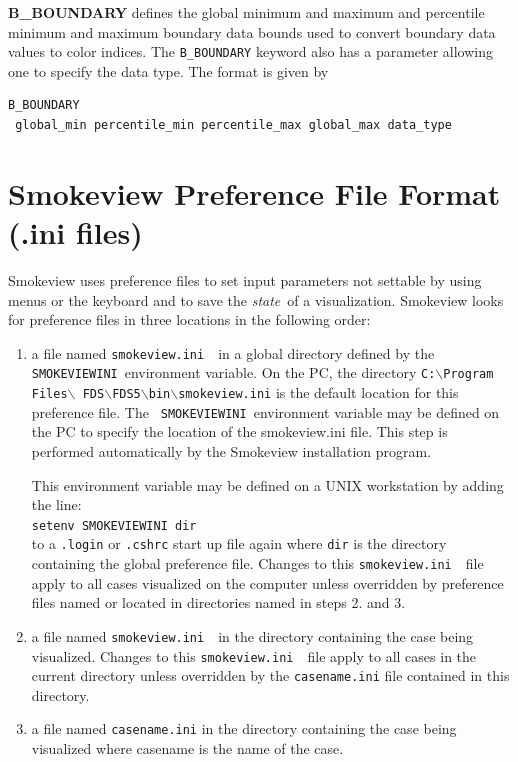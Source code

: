 \documentclass[11pt,twoside]{book}
\newcommand{\svini}{{\tt smokeview.ini}\ }
\begin{document}
{\bf B\_BOUNDARY} defines the global minimum and maximum and percentile minimum and
maximum boundary
data bounds used to convert boundary data values to color indices.
The {\tt B\_BOUNDARY} keyword also has a parameter allowing
one to specify the data type.  The format is given by
\begin{lstlisting}
B_BOUNDARY
 global_min percentile_min percentile_max global_max data_type
\end{lstlisting}



\section{Smokeview Preference File Format (.ini files)}
\label{sectionconfig}
\label{appendixini}

Smokeview uses preference files to set input parameters not
settable by using menus or the keyboard and to save the {\em
state}\ of a visualization. Smokeview looks for preference files
in three locations in the following order:
\begin{enumerate}

\item a file named \svini\ in a global directory defined by the
{\tt SMOKEVIEWINI}\ environment variable. On the PC, the directory
{\tt C:$\backslash$Program Files$\backslash$
FDS$\backslash$FDS5$\backslash$bin$\backslash$smokeview.ini} is
the default location for this preference file. The {\tt
SMOKEVIEWINI}\ environment variable may be defined on the PC to
specify the location of the smokeview.ini file. This step is
performed automatically by the Smokeview installation program.

This environment variable may be
defined on a UNIX workstation by adding the line:\\

{\tt setenv SMOKEVIEWINI dir} \\

to a {\tt .login}  or {\tt .cshrc} start up file
again where {\tt dir} is the directory containing the
global preference file. Changes to this \svini\
file apply to all cases visualized on the computer unless
overridden by preference files named or located in
directories named in steps 2. and  3.

\item a file named \svini\ in the directory
containing the case being visualized.  Changes to
this \svini\ file apply to all cases in the current
directory unless overridden by the {\tt casename.ini} file
contained in this directory.

\item a file named {\tt casename.ini} in the directory containing the case being
visualized where casename is the name of the case.
\end{enumerate}
\end{document}
